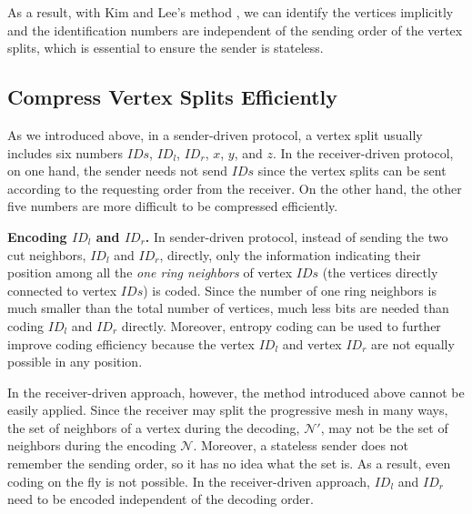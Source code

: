     As a result, with Kim and Lee's method \cite{kim01truly}, we can identify the vertices
    implicitly and the identification numbers are independent of the sending order of the 
    vertex splits, which is essential to ensure the sender is stateless.

    \subsection{Compress Vertex Splits Efficiently}
    As we introduced above, in a sender-driven protocol, 
    a vertex split usually includes six numbers $IDs$, $ID_l$, $ID_r$,
    $x$, $y$, and $z$. 
    In the receiver-driven protocol, on one hand, the sender needs not send
    $IDs$ since the vertex splits can be sent according to
    the requesting order from the receiver. On the other hand, the other 
    five numbers are more difficult to be compressed efficiently.
    
    \textbf{Encoding $ID_l$ and $ID_r$.}
    In sender-driven protocol, instead of sending the two cut neighbors, $ID_l$ and $ID_r$, directly,
    only the information indicating their position among all the \emph{one ring neighbors}
    of vertex $IDs$ (the vertices directly connected to vertex $IDs$) is coded.  
    Since the number of one ring neighbors is much smaller than the total number of vertices,
    much less bits are needed than coding $ID_l$ and $ID_r$ directly. Moreover, entropy coding
    can be used to further improve coding efficiency because the vertex $ID_l$ and vertex $ID_r$
    are not equally possible in any position.

    In the receiver-driven approach, however, the method introduced above cannot be easily applied.
    Since the receiver may split the progressive mesh in many ways, the set of neighbors of 
    a vertex during the decoding, $\mathcal{N}'$, 
    may not be the set of neighbors during the encoding $\mathcal{N}$.
    Moreover, a stateless sender does not remember the sending
    order, so it has no idea what the set is. 
    As a result, even coding on the fly is not possible. 
    In the receiver-driven approach, $ID_l$ and $ID_r$ need to be encoded independent of the decoding order. 

